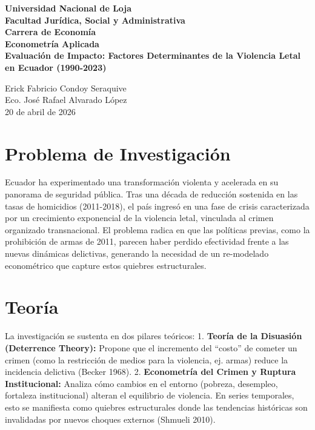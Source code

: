 \documentclass[12pt,spanish]{article}
\begin{document}
\begin{center}
    {\bfseries \Large Universidad Nacional de Loja}\\[0.3cm]
    {\bfseries \large Facultad Jurídica, Social y
Administrativa}\\[0.2cm]
    {\bfseries Carrera de Economía}\\[1.5cm]
    
    {\bfseries \large Econometría Aplicada}\\[1cm]
    
    {\bfseries \Large Evaluación de Impacto: Factores Determinantes de
la Violencia Letal en Ecuador (1990-2023)}\\[1.5cm]
\end{center}

 Erick Fabricio Condoy Seraquive \\
 Eco. José Rafael Alvarado López \\
 20 de abril de 2026 \\

\vspace{1cm}

\doublespacing
\setlength{\parindent}{1.27cm}

\section{Problema de Investigación}\label{problema-de-investigaciuxf3n}

Ecuador ha experimentado una transformación violenta y acelerada en su
panorama de seguridad pública. Tras una década de reducción sostenida en
las tasas de homicidios (2011-2018), el país ingresó en una fase de
crisis caracterizada por un crecimiento exponencial de la violencia
letal, vinculada al crimen organizado transnacional. El problema radica
en que las políticas previas, como la prohibición de armas de 2011,
parecen haber perdido efectividad frente a las nuevas dinámicas
delictivas, generando la necesidad de un re-modelado econométrico que
capture estos quiebres estructurales.

\section{Teoría}\label{teoruxeda}

La investigación se sustenta en dos pilares teóricos: 1. \textbf{Teoría
de la Disuasión (Deterrence Theory):} Propone que el incremento del
``costo'' de cometer un crimen (como la restricción de medios para la
violencia, ej. armas) reduce la incidencia delictiva (Becker 1968). 2.
\textbf{Econometría del Crimen y Ruptura Institucional:} Analiza cómo
cambios en el entorno (pobreza, desempleo, fortaleza institucional)
alteran el equilibrio de violencia. En series temporales, esto se
manifiesta como quiebres estructurales donde las tendencias históricas
son invalidadas por nuevos choques externos (Shmueli 2010).
\end{document}
